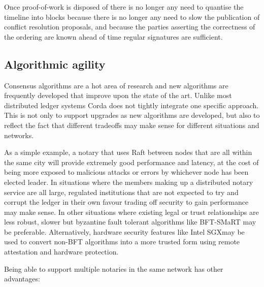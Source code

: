 \documentclass{article}
\begin{document}
Once proof-of-work is disposed of there is no longer any need to quantise the timeline into blocks because there is
no longer any need to slow the publication of conflict resolution proposals, and because the parties asserting the
correctness of the ordering are known ahead of time regular signatures are sufficient.

\subsection{Algorithmic agility}

Consensus algorithms are a hot area of research and new algorithms are frequently developed that improve upon the state
of the art. Unlike most distributed ledger systems Corda does not tightly integrate one specific approach. This is not
only to support upgrades as new algorithms are developed, but also to reflect the fact that different tradeoffs may make
sense for different situations and networks.

As a simple example, a notary that uses Raft between nodes that are all within the same city will provide extremely good
performance and latency, at the cost of being more exposed to malicious attacks or errors by whichever node has been elected
leader. In situations where the members making up a distributed notary service are all large, regulated institutions that
are not expected to try and corrupt the ledger in their own favour trading off security to gain performance may make sense.
In other situations where existing legal or trust relationships are less robust, slower but byzantine fault tolerant
algorithms like BFT-SMaRT\cite{Bessani:2014:SMR:2671853.2672428} may be preferable. Alternatively, hardware security features
like Intel SGX\textregistered may be used to convert non-BFT algorithms into a more trusted form using remote attestation and
hardware protection.

Being able to support multiple notaries in the same network has other advantages:
\end{document}
